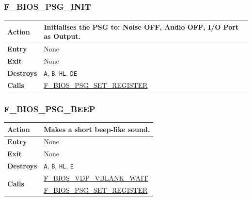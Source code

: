 \documentclass[a4paper,11pt]{article}
\begin{document}
        \subsubsection{F\_BIOS\_PSG\_INIT}
        \label{func:fbiospsginit}
        \begin{tabular}{l p{9cm}}
            \hline\textbf{Action}
            & Initialises the PSG to: Noise OFF, Audio OFF, I/O Port as Output. \\
            \hline\textbf{Entry} & None\\
            \hline\textbf{Exit} & None\\
            \hline\textbf{Destroys} & \texttt{A}, \texttt{B}, \texttt{HL},
            \texttt{DE} \\
            \hline\textbf{Calls} & \hyperref[func:fbiospsgsetregister]
            {F\_BIOS\_PSG\_SET\_REGISTER}\\
            \hline
        \end{tabular}

        \subsubsection{F\_BIOS\_PSG\_BEEP}
        \label{func:fbiospsgbeep}
        \begin{tabular}{l p{9cm}}
            \hline\textbf{Action} & Makes a short beep-like sound. \\
            \hline\textbf{Entry} & None\\
            \hline\textbf{Exit} & None\\
            \hline\textbf{Destroys} & \texttt{A}, \texttt{B}, \texttt{HL},
            \texttt{E} \\
            \hline\multirow[t]{2}{4em}{\textbf{Calls}}
            & \hyperref[func:fbiosvdpvblankwait]{F\_BIOS\_VDP\_VBLANK\_WAIT}\\
            & \hyperref[func:fbiospsgsetregister]{F\_BIOS\_PSG\_SET\_REGISTER}\\
            \hline
        \end{tabular}

\end{document}
